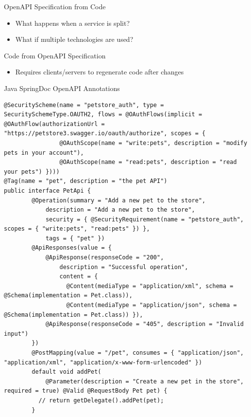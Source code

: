 \documentclass[bigger]{beamer}
\begin{document}
\begin{frame}[label={sec:orgfd7523f}]{OpenAPI Specification from Code}
\begin{itemize}
\item What happens when a service is split?
\item What if multiple technologies are used?
\end{itemize}

\begin{center}

\end{center}
\end{frame}

\begin{frame}[label={sec:orge3042c3}]{Code from OpenAPI Specification}
\begin{itemize}
\item Requires clients/servers to regenerate code after changes
\end{itemize}

\begin{center}

\end{center}
\end{frame}

\begin{frame}[label={sec:org1d7c439},fragile,shrink=30]{Java SpringDoc OpenAPI Annotations}
 \begin{verbatim}
@SecurityScheme(name = "petstore_auth", type = SecuritySchemeType.OAUTH2, flows = @OAuthFlows(implicit = @OAuthFlow(authorizationUrl = "https://petstore3.swagger.io/oauth/authorize", scopes = {
                @OAuthScope(name = "write:pets", description = "modify pets in your account"),
                @OAuthScope(name = "read:pets", description = "read your pets") })))
@Tag(name = "pet", description = "the pet API")
public interface PetApi {
        @Operation(summary = "Add a new pet to the store",
            description = "Add a new pet to the store",
            security = { @SecurityRequirement(name = "petstore_auth", scopes = { "write:pets", "read:pets" }) },
            tags = { "pet" })
        @ApiResponses(value = {
            @ApiResponse(responseCode = "200",
                description = "Successful operation",
                content = {
                  @Content(mediaType = "application/xml", schema = @Schema(implementation = Pet.class)),
                  @Content(mediaType = "application/json", schema = @Schema(implementation = Pet.class)) }),
            @ApiResponse(responseCode = "405", description = "Invalid input")
        })
        @PostMapping(value = "/pet", consumes = { "application/json", "application/xml", "application/x-www-form-urlencoded" })
        default void addPet(
            @Parameter(description = "Create a new pet in the store", required = true) @Valid @RequestBody Pet pet) {
          // return getDelegate().addPet(pet);
        }

\end{verbatim}
\end{frame}
\end{document}
